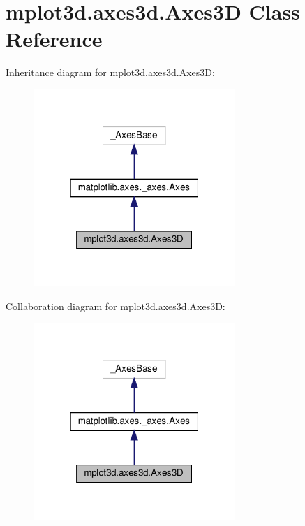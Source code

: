 \hypertarget{classmplot3d_1_1axes3d_1_1Axes3D}{}\section{mplot3d.\+axes3d.\+Axes3D Class Reference}
\label{classmplot3d_1_1axes3d_1_1Axes3D}


Inheritance diagram for mplot3d.\+axes3d.\+Axes3D\+:
\nopagebreak
\begin{figure}[H]
\begin{center}
\leavevmode
\includegraphics[width=217pt]{classmplot3d_1_1axes3d_1_1Axes3D__inherit__graph}
\end{center}
\end{figure}


Collaboration diagram for mplot3d.\+axes3d.\+Axes3D\+:
\nopagebreak
\begin{figure}[H]
\begin{center}
\leavevmode
\includegraphics[width=217pt]{classmplot3d_1_1axes3d_1_1Axes3D__coll__graph}
\end{center}
\end{figure}
